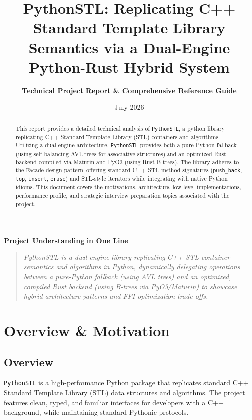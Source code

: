\documentclass[11pt,a4paper]{article}
\title{\textbf{PythonSTL: Replicating C++ Standard Template Library Semantics via a Dual-Engine Python-Rust Hybrid System}}
\author{\textbf{Technical Project Report \& Comprehensive Reference Guide}}
\date{July 2026}
\begin{document}
\maketitle

\begin{abstract}
This report provides a detailed technical analysis of \texttt{PythonSTL}, a python library replicating C++ Standard Template Library (STL) containers and algorithms. Utilizing a dual-engine architecture, \texttt{PythonSTL} provides both a pure Python fallback (using self-balancing AVL trees for associative structures) and an optimized Rust backend compiled via Maturin and PyO3 (using Rust B-trees). The library adheres to the Facade design pattern, offering standard C++ STL method signatures (\texttt{push\_back}, \texttt{top}, \texttt{insert}, \texttt{erase}) and STL-style iterators while integrating with native Python idioms. This document covers the motivations, architecture, low-level implementations, performance profile, and strategic interview preparation topics associated with the project.
\end{abstract}

\begin{center}
\small\textbf{Project Understanding in One Line}
\end{center}
\begin{quote}
\small\noindent\textit{PythonSTL is a dual-engine library replicating C++ STL container semantics and algorithms in Python, dynamically delegating operations between a pure-Python fallback (using AVL trees) and an optimized, compiled Rust backend (using B-trees via PyO3/Maturin) to showcase hybrid architecture patterns and FFI optimization trade-offs.}
\end{quote}


\newpage
\tableofcontents
\newpage

\section{Overview \& Motivation}

\subsection{Overview}
\texttt{PythonSTL} is a high-performance Python package that replicates standard C++ Standard Template Library (STL) data structures and algorithms. The project features clean, typed, and familiar interfaces for developers with a C++ background, while maintaining standard Pythonic protocols. 
\end{document}
